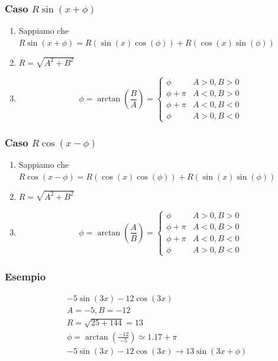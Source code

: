 \documentclass[10pt, a4paper]{article}
\begin{document}
        \subsubsection{Caso $R\sin(x+\phi)$}
            \begin{enumerate}
                \item Sappiamo che $R\sin(x+\phi)=R\left(\sin(x)\cos(\phi)\right)+R\left(\cos(x)\sin(\phi)\right)$
                \item $R=\sqrt{A^2+B^2}$
                \item \begin{equation*}
                    \phi=\arctan\left(\frac{B}{A}\right)=\begin{cases}
                        \phi & A>0,B>0\\
                        \phi+\pi & A<0, B>0\\
                        \phi+\pi & A<0, B<0\\
                        \phi & A>0,B<0
                    \end{cases}
                \end{equation*}
            \end{enumerate}
        \subsubsection{Caso $R\cos(x-\phi)$}
            \begin{enumerate}
                \item Sappiamo che $R\cos(x-\phi)=R\left(\cos(x)\cos(\phi)\right)+R\left(\sin(x)\sin(\phi)\right)$
                \item $R=\sqrt{A^2+B^2}$
                \item \begin{equation*}
                    \phi=\arctan\left(\frac{A}{B}\right)=\begin{cases}
                        \phi & A>0,B>0\\
                        \phi+\pi & A<0, B>0\\
                        \phi+\pi & A<0, B<0\\
                        \phi & A>0,B<0
                    \end{cases}
                \end{equation*}
            \end{enumerate}
        \subsubsection{Esempio}
        \begin{equation*}
            \begin{split}
                &-5\sin(3x)-12\cos(3x)\\
                &A=-5,B=-12\\
                &R=\sqrt{25+144}=13\\
                &\phi=\arctan\left(\frac{-12}{-5}\right)\simeq 1.17+\pi\\
                &-5\sin(3x)-12\cos(3x)\rightarrow 13\sin(3x+\phi)
            \end{split}
        \end{equation*}
\end{document}
